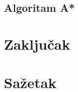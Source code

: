 \documentclass[times, utf8, seminar, numeric]{fer}
\begin{document}
\section{Algoritam A*}


%

\chapter{Zaključak}





\chapter{Sažetak}

\end{document}
